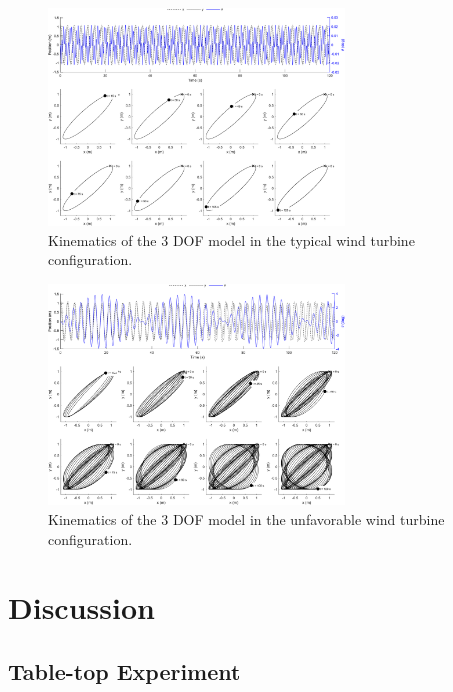\documentclass{article}
\begin{document}
\begin{figure}
    \centering
    \includegraphics[width=0.7\textwidth]{figures/turbine_typical.png}
    \caption{Kinematics of the 3 DOF model in the typical wind turbine configuration.}
    \label{fig:3dof-turbine-typical}
\end{figure}

\begin{figure}
    \centering
    \includegraphics[width=0.7\textwidth]{figures/turbine_unfavorable.png}
    \caption{Kinematics of the 3 DOF model in the unfavorable wind turbine configuration.}
    \label{fig:3dof-turbine-unfavorable}
\end{figure}

\clearpage

\section{Discussion}
\label{sec:discussion}

\subsection{Table-top Experiment}
\end{document}
